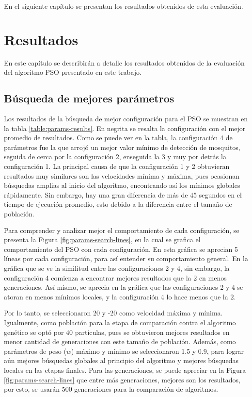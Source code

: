   En el siguiente capítulo se presentan los resultados obtenidos de esta
  evaluación.

\chapter{Resultados}\label{chap:resultados}
En este capítulo se describirán a detalle los resultados obtenidos de la
evaluación del algoritmo PSO presentado en este trabajo.

\section{Búsqueda de mejores parámetros}\label{sect:busqueda-mejores-params}
  Los resultados de la búsqueda de mejor configuración para el PSO se muestran
  en la tabla \ref{table:params-results}. En negrita se resalta la
  configuración con el mejor promedio de resultados. Como se puede ver en la
  tabla, la configuración 4 de parámetros fue la que arrojó un mejor valor
  mínimo de detección de mosquitos, seguida de cerca por la configuración 2,
  enseguida la 3 y muy por detrás la configuración 1. La principal causa de
  que la configuración 1 y 2 obtuvieran resultados muy similares son las
  velocidades mínima y máxima, pues ocasionan búsquedas amplias al inicio del
  algoritmo, encontrando así los mínimos globales rápidamente. Sin embargo,
  hay una gran diferencia de más de 45 segundos en el tiempo de ejecución
  promedio, esto debido a la diferencia entre el tamaño de población.

  Para comprender y analizar mejor el comportamiento de cada configuración,
  se presenta la Figura \ref{fig:params-search-lines}, en la cual se grafica
  el comportamiento del PSO con cada configuración. En esta gráfica se
  aprecian 5 líneas por cada configuración, para así entender su
  comportamiento general. En la gráfica que se ve la similitud entre las
  configuraciones 2 y 4, sin embargo, la configuración 4 comienza a encontrar
  mejores resultados que la 2 en menos generaciones. Así mismo, se aprecia en
  la gráfica que las configuraciones 2 y 4 se atoran en menos mínimos locales,
  y la configuración 4 lo hace menos que la 2.

  Por lo tanto, se seleccionaron 20 y -20 como velocidad máxima y mínima.
  Igualmente, como población para la etapa de comparación contra el algoritmo
  genético se optó por 40 partículas, pues se obtuvieron mejores resultados en
  menor cantidad de generaciones con este tamaño de población. Además, como
  parámetros de peso ($w$) máximo y mínimo se seleccionaron 1.5 y 0.9, para
  lograr aún mejores búsquedas globales al principio del algoritmo y mejores
  búsquedas locales en las etapas finales. Para las generaciones, se puede
  apreciar en la Figura \ref{fig:params-search-lines} que entre más
  generaciones, mejores son los resultados, por esto, se usarán 500
  generaciones para la comparación de algoritmos.
  
